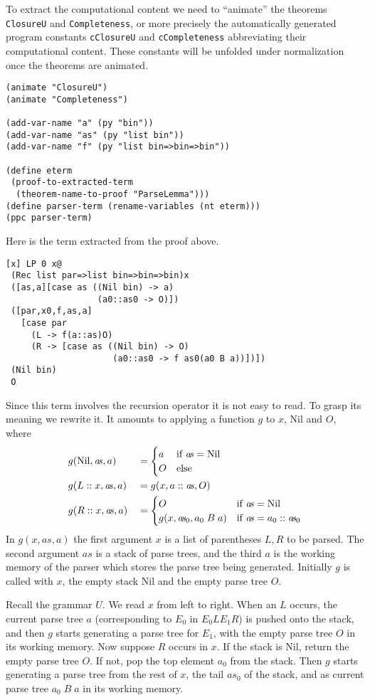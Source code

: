 \documentclass[12pt]{amsart}
\newcommand{\nil}{\mathrm{Nil}}
\newcommand{\as}{\mathit{a}\!\mathit{s}}
\newcommand{\inquotes}[1]{``#1''}
\begin{document}
To extract the computational content we need to \inquotes{animate} the
theorems \verb|ClosureU| and \verb|Completeness|, or more precisely
the automatically generated program constants \verb|cClosureU| and
\verb|cCompleteness| abbreviating their computational content.
These constants will be unfolded under normalization once the theorems
are animated.
\begin{verbatim}
(animate "ClosureU")
(animate "Completeness")

(add-var-name "a" (py "bin"))
(add-var-name "as" (py "list bin"))
(add-var-name "f" (py "list bin=>bin=>bin"))

(define eterm
 (proof-to-extracted-term
  (theorem-name-to-proof "ParseLemma")))
(define parser-term (rename-variables (nt eterm)))
(ppc parser-term)
\end{verbatim}
Here is the term extracted from the proof above.
\begin{verbatim}
[x] LP 0 x@
 (Rec list par=>list bin=>bin=>bin)x
 ([as,a][case as ((Nil bin) -> a) 
                  (a0::as0 -> O)])
 ([par,x0,f,as,a]
   [case par
     (L -> f(a::as)O)
     (R -> [case as ((Nil bin) -> O) 
                     (a0::as0 -> f as0(a0 B a))])])
 (Nil bin)
 O
\end{verbatim}
Since this term involves the recursion operator it is not easy to
read.  To grasp its meaning we rewrite it.  It amounts to applying a
function $g$ to $x$, $\nil$ and $O$, where
\begin{alignat*}{2}
  &g(\nil,\as,a) &&=
  \begin{cases}
    a &\hbox{if $\as = \nil$}
    \\
    O &\hbox{else}
  \end{cases}
  \\
  &g(L::x,\as,a) &&=g(x,a::\as,O)
  \\
  &g(R::x,\as,a) &&=
  \begin{cases}
    O &\hbox{if $\as = \nil$}
    \\
    g(x,\as_0,a_0\;B\;a) &\hbox{if $\as=a_0::\as_0$}
  \end{cases}
\end{alignat*}
In $g(x,\as,a)$ the first argument $x$ is a list of parentheses $L,R$
to be parsed.  The second argument $\as$ is a stack of parse trees,
and the third $a$ is the working memory of the parser which stores the
parse tree being generated.  Initially $g$ is called with $x$, the
empty stack $\nil$ and the empty parse tree $O$.

Recall the grammar $U$.  We read $x$ from left to right.  When an $L$
occurs, the current parse tree $a$ (corresponding to $E_0$ in $E_0 L
E_1 R$) is pushed onto the stack, and then $g$ starts generating a
parse tree for $E_1$, with the empty parse tree $O$ in its working
memory.  Now suppose $R$ occurs in $x$.  If the stack is $\nil$,
return the empty parse tree $O$.  If not, pop the top element $a_0$
from the stack.  Then $g$ starts generating a parse tree from the rest
of $x$, the tail $\as_0$ of the stack, and as current parse tree $a_0
\; B \; a$ in its working memory.
\end{document}
